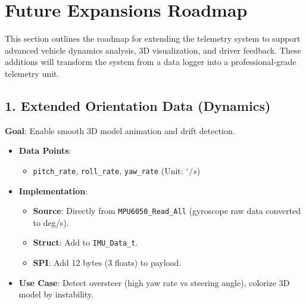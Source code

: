 \documentclass[11pt,a4paper]{article}
\begin{document}
\section{Future Expansions Roadmap}

This section outlines the roadmap for extending the telemetry system to support advanced vehicle dynamics analysis, 3D visualization, and driver feedback. These additions will transform the system from a data logger into a professional-grade telemetry unit.

\subsection{1. Extended Orientation Data (Dynamics)}
\textbf{Goal}: Enable smooth 3D model animation and drift detection.
\begin{itemize}
    \item \textbf{Data Points}:
    \begin{itemize}
        \item \texttt{pitch\_rate}, \texttt{roll\_rate}, \texttt{yaw\_rate} (Unit: $^\circ/s$)
    \end{itemize}
    \item \textbf{Implementation}:
    \begin{itemize}
        \item \textbf{Source}: Directly from \texttt{MPU6050\_Read\_All} (gyroscope raw data converted to deg/s).
        \item \textbf{Struct}: Add to \texttt{IMU\_Data\_t}.
        \item \textbf{SPI}: Add 12 bytes (3 floats) to payload.
    \end{itemize}
    \item \textbf{Use Case}: Detect oversteer (high yaw rate vs steering angle), colorize 3D model by instability.
\end{itemize}
\end{document}
